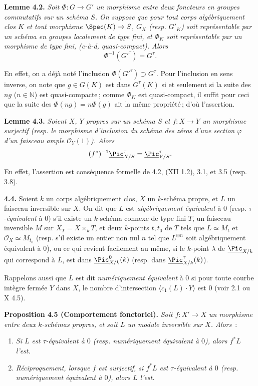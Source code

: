 \textbf{Lemme 4.2.} \emph{Soit \(\Phi:G\to G'\) un morphisme entre deux foncteurs en groupes commutatifs sur un sch\'ema \(S\). On suppose que pour tout corps alg\'ebriquement clos \(K\) et tout morphisme \(\Spec(K)\to S\), \(G_K\) (resp. \(G'_K\)) soit repr\'esentable par un sch\'ema en groupes localement de type fini, et \(\Phi_K\) soit repr\'esentable par un morphisme de type fini, (c-\`a-d, quasi-compact). Alors}
\[
  \Phi^{-1}(G'^\tau)=G^\tau.
\]

En
effet, on a d\'ej\`a not\'e l'inclusion \(\Phi(G'^\tau)\supset G^\tau\). Pour l'inclusion en sens inverse, on note que \(g\in G(K)\) est dans \(G^\tau(K)\) si et seulement si la suite des \(ng\) (\(n\in\mathbb N\)) est quasi-compacte\,; comme \(\Phi_K\) est quasi-compact, il suffit pour ceci que la suite des \(\Phi(ng)=n\Phi(g)\) ait la m\^eme propri\'et\'e\,; d'o\`u l'assertion.

\textbf{Lemme 4.3.} \emph{Soient \(X\), \(Y\) propres sur un sch\'ema \(S\) et \(f:X\to Y\) un morphisme surjectif (resp. le morphisme d'inclusion du sch\'ema des z\'eros d'une section \(\varphi\) d'un faisceau ample \(\mathcal O_Y(1)\)). Alors}
\[
  (f^*)^{-1}\underline{\Pic}^\tau_{X/S}=\underline{\Pic}^\tau_{Y/S}.
\]

En effet, l'assertion est cons\'equence formelle de 4.2, (XII 1.2), 3.1, et 3.5 (resp. 3.8).

\textbf{4.4.} Soient \(k\) un corps alg\'ebriquement clos, \(X\) un \(k\)-sch\'ema propre, et \(L\) un faisceau inversible sur \(X\). On dit que \(L\) est \emph{alg\'ebriquement \'equivalent} \`a \(0\) (resp. \(\tau\)-\emph{\'equivalent} \`a \(0\)) s'il existe un \(k\)-sch\'ema connexe de type fini \(T\), un faisceau inversible \(M\) sur \(X_T=X\times_k T\), et deux \(k\)-points \(t,t_0\) de \(T\) tels que \(L\simeq M_t\) et \(\mathcal O_X\simeq M_{t_0}\) (resp. s'il existe un entier non nul \(n\) tel que \(L^{\otimes n}\) soit alg\'ebriquement \'equivalent \`a \(0\)), ou ce qui revient facilement au m\^eme, si le \(k\)-point \(\lambda\) de \(\underline{\Pic}_{X/k}\) qui correspond \`a \(L\), est dans \(\underline{\Pic}^0_{X/k}(k)\) (resp. dans \(\underline{\Pic}^\tau_{X/k}(k)\)).

Rappelons aussi que \(L\) est dit \emph{num\'eriquement \'equivalent} \`a \(0\) si pour toute courbe int\`egre ferm\'ee \(Y\) dans \(X\), le nombre d'intersection \(\langle c_1(L)\cdot Y\rangle\) est \(0\) (voir 2.1 ou X 4.5).

\textbf{Proposition 4.5 (Comportement fonctoriel).} \emph{Soit \(f:X'\to X\) un morphisme entre deux \(k\)-sch\'emas propres, et soit \(L\) un module inversible sur \(X\). Alors}~:
\begin{enumerate}[label=(\roman*)]
\item \emph{Si \(L\) est \(\tau\)-\'equivalent \`a \(0\) (resp. num\'eriquement \'equivalent \`a \(0\)), alors \(f^*L\) l'est.}
\item \emph{R\'eciproquement, lorsque \(f\) est surjectif, si \(f^*L\) est \(\tau\)-\'equivalent \`a \(0\) (resp. num\'eriquement \'equivalent \`a \(0\)), alors \(L\) l'est.}
\end{enumerate}

